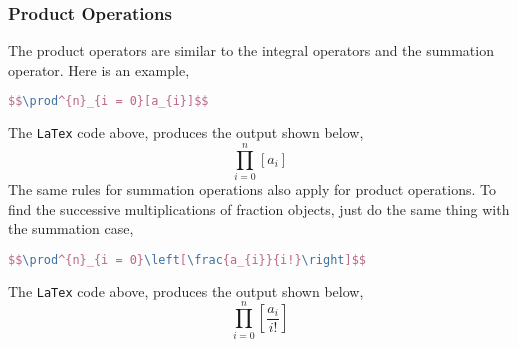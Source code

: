 \documentclass[a4paper, 12pt]{report}
\begin{document}
\begin{center}
\subsubsection{Product Operations}
\begin{comment}
\end{comment}
The product operators are similar to the integral operators and the summation operator. Here is an example,
\begin{lstlisting}[language=tex]
$$\prod^{n}_{i = 0}[a_{i}]$$
\end{lstlisting}
The \texttt{LaTex} code above, produces the output shown below,
$$\prod^{n}_{i = 0}[a_{i}]$$
The same rules for summation operations also apply for product operations. To find the successive multiplications of fraction objects, just do the same thing with the summation case,
\begin{lstlisting}[language=tex]
$$\prod^{n}_{i = 0}\left[\frac{a_{i}}{i!}\right]$$
\end{lstlisting}
The \texttt{LaTex} code above, produces the output shown below,
$$\prod^{n}_{i = 0}\left[\frac{a_{i}}{i!}\right]$$



\end{center}
\end{document}
